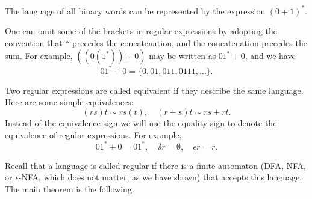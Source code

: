 \begin{page}
\setcounter{section}{2}
\setcounter{subsection}{1}
\setcounter{dfn}{1}
\label{portion:1074}

\begin{exl}
The language of all binary words can be represented by the expression $(0+1)^*$.
\end{exl}

\end{page}

\begin{page}
\setcounter{section}{2}
\setcounter{subsection}{1}
\setcounter{dfn}{1}
\label{portion:1075}



One can omit some of the brackets in regular expressions by adopting the convention that $*$ precedes the concatenation, and the concatenation precedes the sum.
For example, $((0(1^*))+0)$ may be written as $01^* + 0$, and we have
\[
01^* + 0 = \{0, 01, 011, 0111, \ldots\}.
\]

Two regular expressions are called equivalent if they describe the same language.
Here are some simple equivalences:
\[
(rs)t \sim rs(t), \quad (r+s)t \sim rs + rt.
\]
Instead of the equivalence sign we will use the equality sign to denote the equivalence of regular expressions.
For example,
\[
01^* + 0 = 01^*, \quad \emptyset r = \emptyset, \quad \epsilon r = r.
\]



\end{page}

\begin{page}
\setcounter{section}{2}
\setcounter{subsection}{1}
\setcounter{dfn}{2}
\label{portion:1077}


\end{page}

\begin{page}
\setcounter{section}{2}
\setcounter{subsection}{1}
\setcounter{dfn}{2}
\label{portion:1078}



Recall that a language is called regular if there is a finite automaton (DFA, NFA, or $\epsilon$-NFA, which does not matter, as we have shown)
that accepts this language.
The main theorem is the following.

\end{page}

